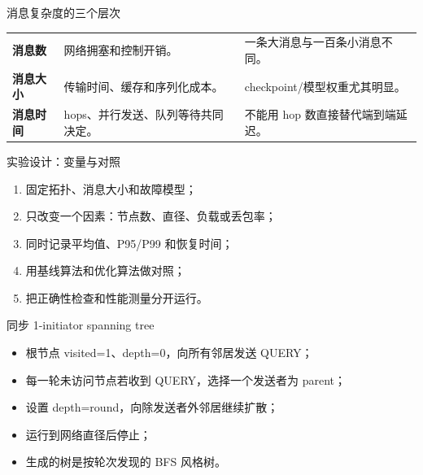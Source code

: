 \documentclass[UTF8,fontset=none,aspectratio=169,10pt]{beamer}
\begin{document}
\begin{frame}{消息复杂度的三个层次}
\begin{tabularx}{\linewidth}{>{\bfseries}p{3.2cm}XX}
\toprule
消息数 & 网络拥塞和控制开销。 & 一条大消息与一百条小消息不同。 \\
消息大小 & 传输时间、缓存和序列化成本。 & checkpoint/模型权重尤其明显。 \\
消息时间 & hops、并行发送、队列等待共同决定。 & 不能用 hop 数直接替代端到端延迟。 \\
\bottomrule
\end{tabularx}
\end{frame}

\begin{frame}{实验设计：变量与对照}
\begin{enumerate}
  \item 固定拓扑、消息大小和故障模型；
  \item 只改变一个因素：节点数、直径、负载或丢包率；
  \item 同时记录平均值、P95/P99 和恢复时间；
  \item 用基线算法和优化算法做对照；
  \item 把正确性检查和性能测量分开运行。
\end{enumerate}
\end{frame}


\begin{frame}{同步 1-initiator spanning tree}
\begin{itemize}
  \item 根节点 visited=1、depth=0，向所有邻居发送 QUERY；
  \item 每一轮未访问节点若收到 QUERY，选择一个发送者为 parent；
  \item 设置 depth=round，向除发送者外邻居继续扩散；
  \item 运行到网络直径后停止；
  \item 生成的树是按轮次发现的 BFS 风格树。
\end{itemize}
\end{frame}
\end{document}
